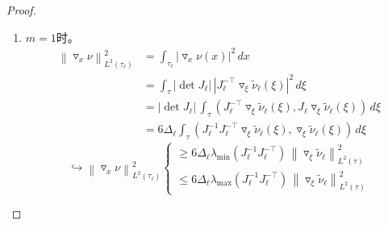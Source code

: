 \begin{proof}
\begin{enumerate}
\item $m=1$时。
\begin{equation*}
  \begin{split}
    \left\|
    \triangledown_{x} \nu
    \right\|_{L^{2}(\tau_{\ell})}^{2}
    & = \int_{\tau_{\ell}}
    \left| \triangledown_{x} \nu(x) \right|^{2}
    \, dx \\
    & = \int_{\tau}
    \left| \det J_{\ell} \right| \,
    \left|
    J_{\ell}^{-\top} \triangledown_{\xi} \widetilde{\nu}_{\ell} \left( \xi \right)
    \right|^{2}
    \, d \xi \\
    & = \left| \det J_{\ell} \right| \,
    \int_{\tau} \left(
    J_{\ell}^{-\top} \triangledown_{\xi} \widetilde{\nu}_{\ell} \left( \xi \right),
    J_{\ell} \triangledown_{\xi} \widetilde{\nu}_{\ell} \left( \xi \right)
    \right)
    \, d \xi \\
    & = 6 \Delta_{\ell}
    \int_{\tau} \left(
    J_{\ell}^{-1} J_{\ell}^{-\top} \triangledown_{\xi} \widetilde{\nu}_{\ell} \left( \xi \right),
    \triangledown_{\xi} \widetilde{\nu}_{\ell} \left( \xi \right)
    \right)
    \, d \xi
  \end{split}
\end{equation*}
\begin{equation*}
  \hookrightarrow \left\|
  \triangledown_{x} \nu
  \right\|_{L^{2}(\tau_{\ell})}^{2}
  \begin{cases}
    \ge 6 \Delta_{\ell} \lambda_{\min}
    \left(
    J_{\ell}^{-1} J_{\ell}^{-\top}
    \right) \,
    \left\|
    \triangledown_{\xi} \widetilde{\nu}_{\ell}
    \right\|_{L^{2}(\tau)}^{2}  \\
    \le 6 \Delta_{\ell} \lambda_{\max}
    \left(
    J_{\ell}^{-1} J_{\ell}^{-\top}
    \right) \,
    \left\|
    \triangledown_{\xi} \widetilde{\nu}_{\ell}
    \right\|_{L^{2}(\tau)}^{2}
  \end{cases}
\end{equation*}


\end{enumerate}
\end{proof}
